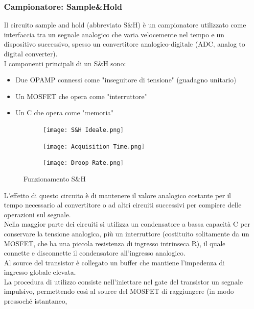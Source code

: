 \documentclass{article}
\begin{document}
\subsubsection{Campionatore: Sample\&Hold}
Il circuito sample and hold (abbreviato S\&H) è un campionatore utilizzato come interfaccia tra un 
segnale analogico che varia velocemente nel tempo e un dispositivo successivo, spesso un 
convertitore analogico-digitale (ADC, analog to digital converter).\\
\newpage
\noindent
I componenti principali di un S\&H sono:
\begin{itemize}
    \item Due OPAMP connessi come "inseguitore di tensione" (guadagno unitario)
    \item Un MOSFET che opera come "interruttore" 
    \item Un C che opera come "memoria"
\end{itemize}
\begin{figure}
\begin{subfigure}[]{}
   \centering
    \texttt{[image: S\&H Ideale.png]}
    \label{fig:S&H Funzionamento ideale}
\end{subfigure}
\hfill
\begin{subfigure}[]{}
   \centering
   \texttt{[image: Acquisition Time.png]}
   \label{fig:S&H Funzionamento Reale}
\end{subfigure}
\hfill
\begin{subfigure}
   \centering
   \texttt{[image: Droop Rate.png]}
   \label{fig:Droop Rate}
\end{subfigure}
        \caption{Funzionamento S\&H}
        \label{fig:Sample}
\end{figure}
L'effetto di questo circuito è di 
mantenere il valore analogico costante per il tempo necessario al convertitore o ad altri circuiti 
successivi per compiere delle operazioni sul segnale. \\
Nella maggior parte dei circuiti si utilizza un condensatore a bassa capacità C per conservare la 
tensione analogica, più un interruttore (costituito solitamente da un MOSFET, che ha una piccola 
resistenza di ingresso intrinseca R), il quale connette e disconnette il condensatore all'ingresso 
analogico.\\
Al source del transistor è collegato un buffer che mantiene l'impedenza di ingresso 
globale elevata.\\
La procedura di utilizzo consiste nell'iniettare nel gate del transistor un segnale 
impulsivo, permettendo così al source del MOSFET di raggiungere (in modo pressoché istantaneo, 
\end{document}

